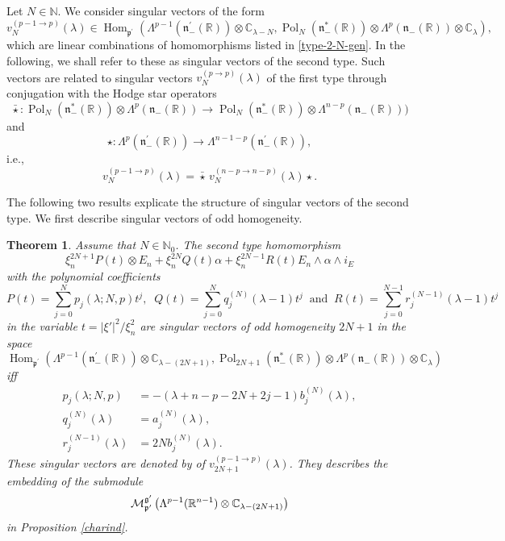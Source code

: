 \documentclass[a4paper,12pt,reqno]{amsart}
\newtheorem{theorem}{Theorem}
\numberwithin{theorem}{subsection}
\numberwithin{equation}{section}
\begin{document}
Let $N \in {\mathbb{N}}$. We consider singular vectors of the form
$$
   v^{(p-1 \to p)}_N(\lambda) \in {\operatorname{Hom}}_{{{\mathfrak p}}^\prime}(\Lambda^{p-1}({{\mathfrak n}}_-^\prime({\mathbb{R}})) \otimes {\mathbb{C}}_{\lambda-N},
   {\operatorname{Pol}}_N ({{\mathfrak n}}_-^*({\mathbb{R}})) \otimes \Lambda^p({{\mathfrak n}}_-({\mathbb{R}})) \otimes {\mathbb{C}}_\lambda),
$$
which are linear combinations of homomorphisms listed in \eqref{type-2-N-gen}.
In the following, we shall refer to these as singular vectors of the second
type. Such vectors are related to singular vectors $v_N^{(p \to p)}(\lambda)$
of the first type through conjugation with the Hodge star operators
$$
   \bar{\star}: {\operatorname{Pol}}_{N}({{\mathfrak n}}_-^*({\mathbb{R}})) \otimes \Lambda^p({{\mathfrak n}}_-({\mathbb{R}})) \to
   {\operatorname{Pol}}_{N}({{\mathfrak n}}_-^*({\mathbb{R}})) \otimes \Lambda^{n-p}({{\mathfrak n}}_-({\mathbb{R}})))
$$
and
$$
   \star: \Lambda^{p}({{\mathfrak n}}_-^\prime({\mathbb{R}})) \to \Lambda^{n-1-p}({{\mathfrak n}}_-^\prime({\mathbb{R}})),
$$
i.e.,
$$
   v_N^{(p-1 \to p)}(\lambda) = \bar{\star} \, v_N^{(n-p \to n-p)}(\lambda) \star.
$$

The following two results explicate the structure of singular vectors of the
second type. We first describe singular vectors of odd homogeneity.

\begin{theorem}\label{OddFromPtoP-1} Assume that $N \in {\mathbb{N}}_0$. The second type
homomorphism
\begin{equation}
   \xi_n^{2N+1} P(t) \otimes E_n + \xi_n^{2N} Q(t) \alpha + \xi_n^{2N-1} R(t) E_n \wedge \alpha \wedge i_E
\end{equation}
with the polynomial coefficients
$$
   P(t) = \sum_{j=0}^N p_j(\lambda;N,p) t^j, \;\;
   Q(t) = \sum_{j=0}^N q^{(N)}_j(\lambda\!-\!1) t^j  \;\; \mbox{and}  \;\;
   R(t) = \sum_{j=0}^{N-1} r^{(N-1)}_j(\lambda\!-\!1) t^j
$$
in the variable $t = {\lvert{\xi'}\rvert}^2/\xi_n^2$ are singular vectors of odd
homogeneity $2N+1$ in the space
$$
   {\operatorname{Hom}}_{{{\mathfrak p}}^\prime}(\Lambda^{p-1}({{\mathfrak n}}_-^\prime({\mathbb{R}})) \otimes {\mathbb{C}}_{\lambda-(2N+1)},
   {\operatorname{Pol}}_{2N+1}({{\mathfrak n}}_-^*({\mathbb{R}})) \otimes \Lambda^p({{\mathfrak n}}_-({\mathbb{R}})) \otimes {\mathbb{C}}_\lambda)
$$
iff
\begin{align*}
   p_j(\lambda;N,p) & = -(\lambda\!+\!n\!-\!p\!-\!2N\!+\!2j\!-\!1) b_j^{(N)}(\lambda), \\
   q_j^{(N)}(\lambda) & = a_j^{(N)}(\lambda), \\
   r_j^{(N-1)}(\lambda) & = 2N b_j^{(N)}(\lambda).
\end{align*}
These singular vectors are denoted by of $v^{(p-1 \to p)}_{2N+1}(\lambda)$.
They describes the embedding of the submodule
$$
   {\fam2 M}^{{{\mathfrak g}}^\prime}_{{{\mathfrak p}}^\prime} \left(\Lambda^{p-1}({\mathbb{R}}^{n-1}) \otimes {\mathbb{C}}_{\lambda-(2N+1)}\right)
$$
in Proposition \ref{charind}.
\end{theorem}
\end{document}
